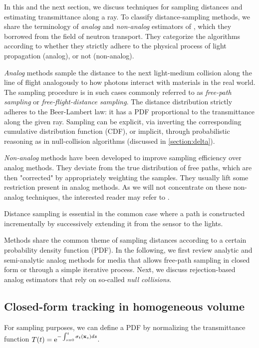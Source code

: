 In this and the next section, we discuss techniques for sampling distances and estimating transmittance along a ray. To classify distance-sampling methods, we share the terminology of \textit{analog} and \textit{non-analog} estimators of \cite{Novak18}, which they borrowed from the field of neutron transport. They categorize the algorithms according to whether they strictly adhere to the physical process of light propagation (analog), or not (non-analog).

\textit{Analog} methods sample the distance to the next light-medium collision along the line of flight analogously to how photons interact with materials in the real world. The sampling procedure is in such cases commonly referred to as \textit{free-path sampling} or \textit{free-flight-distance sampling}. The distance distribution strictly adheres to the Beer-Lambert law: it has a PDF proportional to the transmittance along the given ray. Sampling can be explicit, via inverting the corresponding cumulative distribution function (CDF), or implicit, through probabilistic reasoning as in null-collision algorithms (discussed in \ref{section:delta}).

\textit{Non-analog} methods have been developed to improve sampling efficiency over analog methods. They deviate from the true distribution of free paths, which are then "corrected" by appropriately weighting the samples. They usually lift some restriction present in analog methods. As we will not concentrate on these non-analog techniques, the interested reader may refer to \cite{Novak18}.

Distance sampling is essential in the common case where a path is constructed incrementally by successively extending it from the sensor to the lights. 

Methods share the common theme of sampling distances according to a certain probability density function (PDF). In the following, we first review analytic and semi-analytic analog methods for media that allows free-path sampling in closed form or through a simple iterative process. Next, we discuss rejection-based analog estimators that rely on so-called \textit{null collisions}. 

\subsection{Closed-form tracking in homogeneous volume}

For sampling purposes, we can define a PDF by normalizing the transmittance function $T(t) = \text{e}^{-\int_{s=0}^t \sigma_t (\textbf{x}_s)ds}$. 

